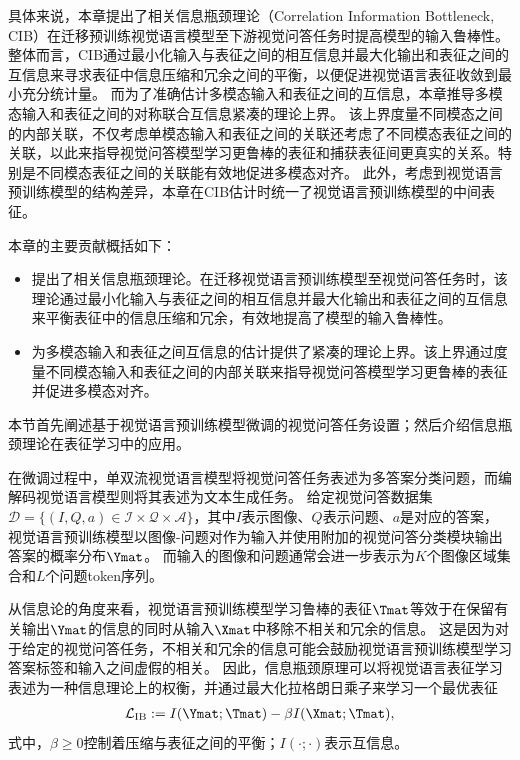 具体来说，本章提出了相关信息瓶颈理论（Correlation Information Bottleneck, CIB）在迁移预训练视觉语言模型至下游视觉问答任务时提高模型的输入鲁棒性。
整体而言，CIB通过最小化输入与表征之间的相互信息并最大化输出和表征之间的互信息来寻求表征中信息压缩和冗余之间的平衡，以便促进视觉语言表征收敛到最小充分统计量。
而为了准确估计多模态输入和表征之间的互信息，本章推导多模态输入和表征之间的对称联合互信息紧凑的理论上界。
该上界度量不同模态之间的内部关联，不仅考虑单模态输入和表征之间的关联还考虑了不同模态表征之间的关联，以此来指导视觉问答模型学习更鲁棒的表征和捕获表征间更真实的关系。特别是不同模态表征之间的关联能有效地促进多模态对齐。
此外，考虑到视觉语言预训练模型的结构差异，本章在CIB估计时统一了视觉语言预训练模型的中间表征。

本章的主要贡献概括如下：
\begin{itemize}
\item 提出了相关信息瓶颈理论。在迁移视觉语言预训练模型至视觉问答任务时，该理论通过最小化输入与表征之间的相互信息并最大化输出和表征之间的互信息来平衡表征中的信息压缩和冗余，有效地提高了模型的输入鲁棒性。
\item 为多模态输入和表征之间互信息的估计提供了紧凑的理论上界。该上界通过度量不同模态输入和表征之间的内部关联来指导视觉问答模型学习更鲁棒的表征并促进多模态对齐。
\end{itemize}




本节首先阐述基于视觉语言预训练模型微调的视觉问答任务设置；然后介绍信息瓶颈理论在表征学习中的应用。


在微调过程中，单双流视觉语言模型将视觉问答任务表述为多答案分类问题，而编解码视觉语言模型则将其表述为文本生成任务。
给定视觉问答数据集$\mathcal{D}=\{(I, Q, a)\in \mathcal{I}\times \mathcal{Q}\times \mathcal{A} \}$，其中$I$表示图像、$Q$表示问题、$a$是对应的答案，视觉语言预训练模型以图像-问题对作为输入并使用附加的视觉问答分类模块输出答案的概率分布$\Ymat$。
而输入的图像和问题通常会进一步表示为$K$个图像区域集合和$L$个问题token序列。



从信息论的角度来看，视觉语言预训练模型学习鲁棒的表征$\Tmat$等效于在保留有关输出$\Ymat$的信息的同时从输入$\Xmat$中移除不相关和冗余的信息。
这是因为对于给定的视觉问答任务，不相关和冗余的信息可能会鼓励视觉语言预训练模型学习答案标签和输入之间虚假的相关。
因此，信息瓶颈原理可以将视觉语言表征学习表述为一种信息理论上的权衡，并通过最大化拉格朗日乘子来学习一个最优表征
\begin{equation}
\begin{aligned} 
\mathcal{L}_{\text{IB}} := I(\Ymat; \Tmat) - \beta I(\Xmat; \Tmat),
\end{aligned}
\label{eq:ib} 
\end{equation}
式中，$\beta \ge 0$控制着压缩与表征之间的平衡；$I(\cdot; \cdot)$表示互信息。


